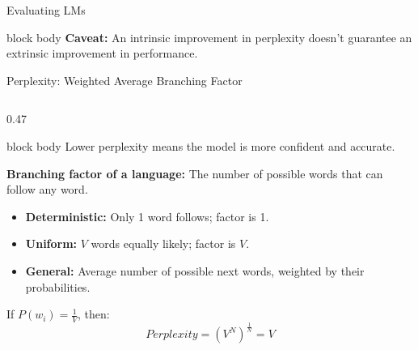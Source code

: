 \documentclass[aspectratio=169,xcolor=dvipsnames,svgnames,x11names,fleqn]{beamer}
\begin{document}
\begin{frame}{Evaluating LMs}
    \begin{beamercolorbox}[wd=\textwidth, sep=5pt, rounded=true]{block body}
        \footnotesize \textcolor{evalGold!80!black}{\faExclamationTriangle} \textbf{Caveat:} An intrinsic improvement in perplexity doesn't guarantee an extrinsic improvement in performance.
    \end{beamercolorbox}
\end{frame}

\begin{frame}[fragile]{Perplexity: Weighted Average Branching Factor}


    \begin{columns}[T]
        \begin{column}{0.47\textwidth}
            \footnotesize
            \begin{beamercolorbox}[wd=\textwidth, sep=4pt, rounded=true]{block body}
                \footnotesize \textcolor{branchEmerald}{\faCheckCircle} Lower perplexity means the model is more confident and accurate.
            \end{beamercolorbox}

            \vspace{5pt}
            \textcolor{branchEmerald}{\textbf{Branching factor of a language:}} 
            The number of possible words that can follow any word. 
            
            \begin{itemize}
                \item \textbf{Deterministic:} Only 1 word follows; factor is 1.
                \item \textbf{Uniform:} $V$ words equally likely; factor is $V$.
                \item \textbf{General:} Average number of possible next words, weighted by their probabilities.
            \end{itemize}

            \vspace{5pt}
            \begin{tcolorbox}[colback=branchEmerald!5, colframe=branchEmerald, arc=1mm, title=\scriptsize Uniform Case, fonttitle=\bfseries]
                If $P(w_i) = \frac{1}{V}$, then:
                \begin{equation*}
                Perplexity = (V^N)^{\frac{1}{N}} = V
                \end{equation*}
            \end{tcolorbox}
        \end{column}


\end{columns}
\end{frame}
\end{document}
